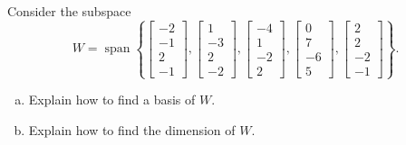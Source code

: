 
\begin{exerciseStatement}


Consider the subspace \[W=\operatorname{span}  \left\{ \left[\begin{array}{c}
-2 \\
-1 \\
2 \\
-1
\end{array}\right] , \left[\begin{array}{c}
1 \\
-3 \\
2 \\
-2
\end{array}\right] , \left[\begin{array}{c}
-4 \\
1 \\
-2 \\
2
\end{array}\right] , \left[\begin{array}{c}
0 \\
7 \\
-6 \\
5
\end{array}\right] , \left[\begin{array}{c}
2 \\
2 \\
-2 \\
-1
\end{array}\right] \right\} .\]


\begin{enumerate}[(a)]
\item  Explain how to find a basis of \(W\).
\item  Explain how to find the dimension of \(W\).
\end{enumerate}
    
\end{exerciseStatement}
    
